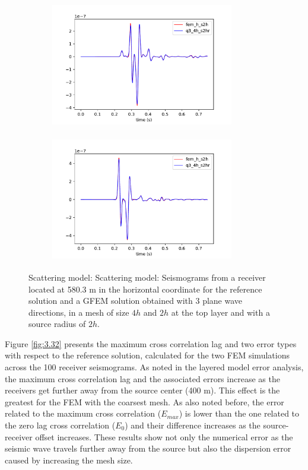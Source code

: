  \begin{figure}[h!]
 		\centering
		\begin{subfigure}{8cm}
				\includegraphics[width=8cm, height=5.5cm]{Thesis_Edith/figures/scattering/scat_waves/gfem3_scat_tr15.pdf}
			     \caption{}
		\end{subfigure}
        \hspace{0.25cm}	
		\begin{subfigure}{8cm}
				\includegraphics[width=8cm, height=5.5cm]{Thesis_Edith/figures/scattering/scat_waves/gfem3_scat_tr75.pdf}
			   \caption{}
		\end{subfigure}
 
	\caption{Scattering model: Scattering model: Seismograms from a receiver located at 580.3 m in the horizontal coordinate for the reference solution and a GFEM solution obtained with 3 plane wave directions, in a mesh of size  $4h$ and $2h$ at the top layer and with a source radius of $2h$.}
	\label{fig:3.31}
\end{figure}

\clearpage
 Figure \ref{fig:3.32} presents the maximum cross correlation lag and two error types with respect to the reference solution, calculated for the two FEM simulations across the 100 receiver seismograms. As noted in the layered model error analysis, the maximum cross correlation lag and the associated errors increase as the receivers get further away from the source center (400 m). This effect is the greatest for the FEM with the coarsest mesh. As also noted before, the error related to the maximum cross correlation ($E_{max}$) is lower than the one related to the zero lag cross correlation ($E_0$) and their difference increases as the source-receiver offset increases. These results show not only the numerical error as the seismic wave travels further away from the source but also the dispersion error caused by increasing the mesh size.
 
